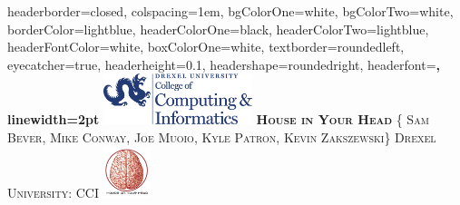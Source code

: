 \documentclass[landscape,a0paper,fontscale=0.285]{baposter} %
\begin{document}
\begin{poster}
{
headerborder=closed, %
colspacing=1em, %
bgColorOne=white, %
bgColorTwo=white, %
borderColor=lightblue, %
headerColorOne=black, %
headerColorTwo=lightblue, %
headerFontColor=white, %
boxColorOne=white, %
textborder=roundedleft, %
eyecatcher=true, %
headerheight=0.1\textheight, %
headershape=roundedright, %
headerfont=\Large\bf\textsc, %
linewidth=2pt %
}
%
{\includegraphics[height=4em]{drexel.png}} %
{\bf\textsc{House in Your Head}\vspace{0.5em}} %
{\textsc{\{ Sam Bever, Mike Conway, Joe Muoio, Kyle Patron, Kevin Zakszewski\} \hspace{12pt} Drexel University: CCI}} %
{\includegraphics[height=4em]{logo.png}} %



\end{poster}
\end{document}

